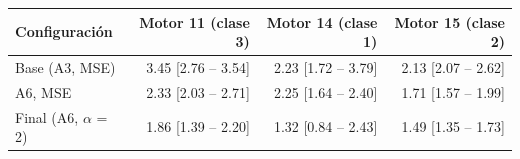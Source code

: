 \begin{tabular}{lrrr}
\toprule
\textbf{Configuración} & \textbf{Motor 11 (clase 3)} & \textbf{Motor 14 (clase 1)} & \textbf{Motor 15 (clase 2)} \\
\midrule
Base (A3, MSE) & 3.45 [2.76 – 3.54] & 2.23 [1.72 – 3.79] & 2.13 [2.07 – 2.62] \\
A6, MSE & 2.33 [2.03 – 2.71] & 2.25 [1.64 – 2.40] & 1.71 [1.57 – 1.99] \\
Final (A6, $\alpha$ = 2) & 1.86 [1.39 – 2.20] & 1.32 [0.84 – 2.43] & 1.49 [1.35 – 1.73] \\
\bottomrule
\end{tabular}
